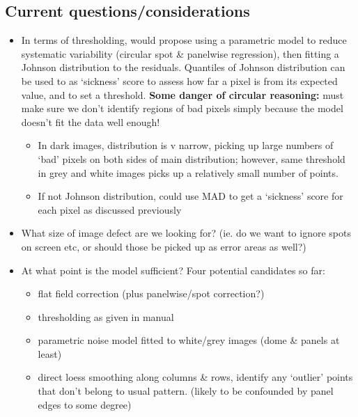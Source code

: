 \documentclass[10pt,fleqn]{article}
\begin{document}
\subsection*{Current questions/considerations}
\begin{itemize}

\item In terms of thresholding, would propose using a parametric model to reduce systematic variability (circular spot \& panelwise regression), then fitting a Johnson distribution to the residuals. Quantiles of Johnson distribution can be used to as `sickness' score to assess how far a pixel is from its expected value, and to set a threshold. \textbf{Some danger of circular reasoning:} must make sure we don't identify regions of bad pixels simply because the model doesn't fit the data well enough!

\begin{itemize}
\item In dark images, distribution is v narrow, picking up large numbers of `bad' pixels on both sides of main distribution; however, same threshold in grey and white images picks up a relatively small number of points.

\item If not Johnson distribution, could use MAD to get a `sickness' score for each pixel as discussed previously
\end{itemize}

\item What size of image defect are we looking for? (ie. do we want to ignore spots on screen etc, or should those be picked up as error areas as well?) 

\item At what point is the model sufficient? Four potential candidates so far:

\begin{itemize}
\item flat field correction (plus panelwise/spot correction?)
\item thresholding as given in manual
\item parametric noise model fitted to white/grey images (dome \& panels at least)
\item direct loess smoothing along columns \& rows, identify any `outlier' points that don't belong to usual pattern. (likely to be confounded by panel edges to some degree) 
\end{itemize}

\end{itemize}
\end{document}
